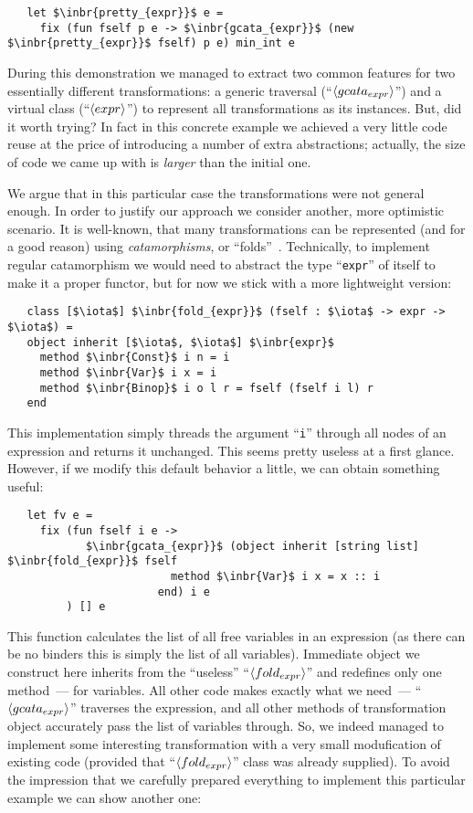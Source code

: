 \begin{lstlisting}
   let $\inbr{pretty_{expr}}$ e =
     fix (fun fself p e -> $\inbr{gcata_{expr}}$ (new $\inbr{pretty_{expr}}$ fself) p e) min_int e
\end{lstlisting}

During this demonstration we managed to extract two common features for two essentially different transformations: a generic traversal (``$\left<gcata_{expr}\right>$'')
and a virtual class (``$\left<expr\right>$'') to represent all transformations as its instances. But, did it worth trying? In fact in this concrete example we achieved a
very little code reuse at the price of introducing a number of extra abstractions; actually, the size of code we came up with is \emph{larger} than the initial one.

We argue that in this particular case the transformations were not general enough. In order to justify our approach we consider another, more optimistic scenario. It is
well-known, that many transformations can be represented (and for a good reason) using \emph{catamorphisms}, or ``folds''~\cite{Fold,Bananas,CalculatingFP}. Technically, to
implement regular catamorphism we would need to abstract the type ``\lstinline{expr}'' of itself to make it a proper functor, but for now we stick with a more
lightweight version:

\begin{lstlisting}
   class [$\iota$] $\inbr{fold_{expr}}$ (fself : $\iota$ -> expr -> $\iota$) =
   object inherit [$\iota$, $\iota$] $\inbr{expr}$ 
     method $\inbr{Const}$ i n = i
     method $\inbr{Var}$ i x = i
     method $\inbr{Binop}$ i o l r = fself (fself i l) r
   end
\end{lstlisting}

This implementation simply threads the argument ``\lstinline{i}'' through all nodes of an expression and returns it unchanged. This seems pretty useless at a first
glance. However, if we modify this default behavior a little, we can obtain something useful:

\begin{lstlisting}
   let fv e =
     fix (fun fself i e ->
            $\inbr{gcata_{expr}}$ (object inherit [string list] $\inbr{fold_{expr}}$ fself
                         method $\inbr{Var}$ i x = x :: i
                       end) i e
         ) [] e
\end{lstlisting}

This function calculates the list of all free variables in an expression (as there can be no binders this is simply the list of all variables). Immediate object we
construct here inherits from the ``useless'' ``$\left<fold_{expr}\right>$'' and redefines only one method~--- for variables. All other code makes exactly what we need~---
``$\left<gcata_{expr}\right>$'' traverses the expression, and all other methods of transformation object accurately pass the list of variables through. So, we indeed
managed to implement some interesting transformation with a very small modufication of existing code (provided that ``$\left<fold_{expr}\right>$'' class was already supplied).
To avoid the impression that we carefully prepared everything to implement this particular example we can show another one:

